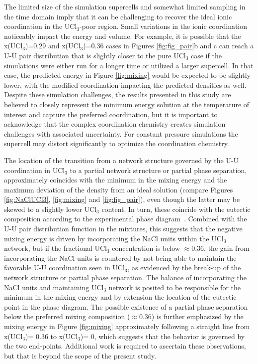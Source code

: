 \documentclass[preprint,3p,10pt,onecolumn,number,sort&compress]{elsarticle}
\begin{document}
{The limited size of the simulation supercells and somewhat limited sampling in the time domain imply that it can be challenging to recover the ideal ionic coordination in the UCl$_3$-poor region. Small variations in the ionic coordination noticeably impact the energy and volume. For example, it is possible that the x(UCl$_3$)=0.29 and x(UCl$_3$)=0.36 cases in Figures \ref{fig:fig_pair}b and c can reach a U-U pair distribution that is slightly closer to the pure UCl$_3$ case if the simulations were either run for a longer time or utilized a larger supercell. In that case, the predicted energy in Figure \ref{fig:mixing} would be expected to be slightly lower, with the modified coordination impacting the predicted densities as well. Despite these simulation challenges, the results presented in this study are believed to closely represent the minimum energy solution at the temperature of interest and capture the preferred coordination, but it is important to acknowledge that the complex coordination chemistry creates simulation challenges with associated uncertainty. For constant pressure simulations the supercell may distort significantly to optimize the coordination chemistry.

The location of the transition from a network structure governed by the U-U coordination in UCl$_3$ to a partial network structure or partial phase separation, approximately coincides with the minimum in the mixing energy and the maximum deviation of the density from an ideal solution (compare Figures \ref{fig:NaClUCl3}, \ref{fig:mixing} and \ref{fig:fig_pair}), even though the latter may be skewed to a slightly lower UCl$_3$ content. In turn, these coincide with the eutectic composition according to the experimental phase diagram~\cite{YIN2020}. Combined with the U-U pair distribution function in the mixtures, this suggests that the negative mixing energy is driven by incorporating the NaCl units within the UCl$_3$ network,
but if the fractional UCl$_3$ concentration is below $\approx0.36$, the gain from incorporating the NaCl units is countered by not being able to maintain the favorable U-U coordination seen in UCl$_3$, as evidenced by the break-up of the network structure or partial phase separation. The balance of incorporating the  NaCl units and maintaining UCl$_3$ network is posited to be responsible for the minimum in the mixing energy and by extension the location of the eutectic point in the phase diagram. The possible existence of a partial phase separation below the preferred mixing composition ($\approx 0.36$) is further emphasized by the mixing energy in Figure \ref{fig:mixing} approximately following a straight line from x(UCl$_3$)= 0.36 to x(UCl$_3$)= 0, which suggests that the behavior is governed by the two end-points. Additional work is required to ascertain these observations, but that is beyond the scope of the present study.

}
\end{document}

